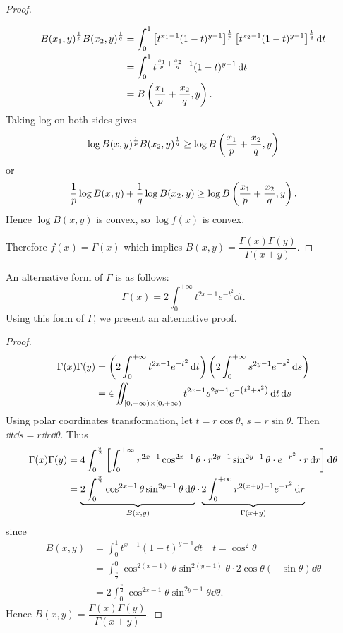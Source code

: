 \begin{proof}
\begin{enumerate}[label=(\roman*)]
\begin{align*}
B(x_1,y)^\frac{1}{p}B(x_2,y)^\frac{1}{q}
&=\int_0^1\left[t^{x_1-1}(1-t)^{y-1}\right]^\frac{1}{p}\left[t^{x_2-1}(1-t)^{y-1}\right]^\frac{1}{q}\dd{t}\\
&=\int_0^1 t^{\frac{x_1}{p}+\frac{x_2}{q}-1}(1-t)^{y-1}\dd{t}\\
&=B\left(\frac{x_1}{p}+\frac{x_2}{q},y\right).
\end{align*}
Taking log on both sides gives
\[\log B(x,y)^\frac{1}{p}B(x_2,y)^\frac{1}{q}\ge\log B\left(\frac{x_1}{p}+\frac{x_2}{q},y\right)\]
or
\[\frac{1}{p}\log B(x,y)+\frac{1}{q}\log B(x_2,y)\ge\log B\left(\frac{x_1}{p}+\frac{x_2}{q},y\right).\]
Hence $\log B(x,y)$ is convex, so $\log f(x)$ is convex.
\end{enumerate}
Therefore $f(x)=\Gamma(x)$ which implies $B(x,y)=\dfrac{\Gamma(x)\Gamma(y)}{\Gamma(x+y)}$.
\end{proof}

An alternative form of $\Gamma$ is as follows:
\[\Gamma(x)=2\int_0^{+\infty}t^{2x-1}e^{-t^2}\dd{t}.\]
Using this form of $\Gamma$, we present an alternative proof.

\begin{proof}
\begin{align*}
\Gamma(x)\Gamma(y)
&=\left(2\int_0^{+\infty}t^{2x-1}e^{-t^2}\dd{t}\right)\left(2\int_0^{+\infty}s^{2y-1}e^{-s^2}\dd{s}\right)\\
&=4\iint_{[0,+\infty)\times[0,+\infty)}t^{2x-1}s^{2y-1}e^{-\left(t^2+s^2\right)}\dd{t}\dd{s}
\end{align*}
Using polar coordinates transformation, let $t=r\cos\theta$, $s=r\sin\theta$. Then $\dd{t}\dd{s}=r\dd{r}\dd{\theta}$. Thus
\begin{align*}
\Gamma(x)\Gamma(y)
&=4\int_0^\frac{\pi}{2}\left[\int_0^{+\infty}r^{2x-1}\cos^{2x-1}\theta\cdot r^{2y-1}\sin^{2y-1}\theta\cdot e^{-r^2}\cdot r\dd{r}\right]\dd{\theta}\\
&=\underbrace{2\int_0^\frac{\pi}{2}\cos^{2x-1}\theta\sin^{2y-1}\theta\dd{\theta}}_{B(x,y)}\cdot\underbrace{2\int_0^{+\infty}r^{2(x+y)-1}e^{-r^2}\dd{r}}_{\Gamma(x+y)}
\end{align*}
since
\begin{align*}
B(x,y)&=\int_0^1 t^{x-1}(1-t)^{y-1}\dd{t}\quad t=\cos^2\theta\\
&=\int_\frac{\pi}{2}^0 \cos^{2(x-1)}\theta\sin^{2(y-1)}\theta\cdot2\cos\theta(-\sin\theta)\dd{\theta}\\
&=2\int_0^\frac{\pi}{2}\cos^{2x-1}\theta\sin^{2y-1}\theta\dd{\theta}.
\end{align*}
Hence $B(x,y)=\dfrac{\Gamma(x)\Gamma(y)}{\Gamma(x+y)}$.
\end{proof}

